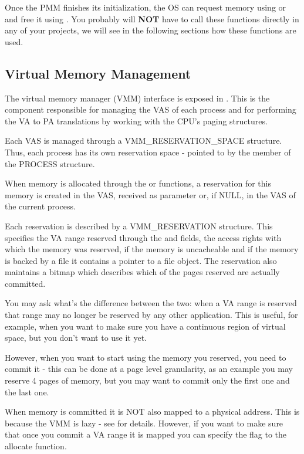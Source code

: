 \begin{appendices}
Once the PMM finishes its initialization, the OS can request memory using  or
 and free it using . You probably will \textbf{NOT}
have to call these functions directly in any of your projects, we will see in the following sections
how these functions are used.

\subsection{Virtual Memory Management}
\label{sect:VMM}

The virtual memory manager (VMM) interface is exposed in . This is the component
responsible for managing the VAS of each process and for performing the VA to PA translations by
working with the CPU's paging structures.

Each VAS is managed through a VMM\_RESERVATION\_SPACE structure. Thus, each process has its own
reservation space - pointed to by the  member of the PROCESS structure.

When memory is allocated through the  or  functions, a
reservation for this memory is created in the VAS, received as parameter or, if NULL, in the VAS of
the current process.

Each reservation is described by a VMM\_RESERVATION structure. This specifies the VA range reserved
through the  and  fields, the access rights with which the memory was
reserved, if the memory is uncacheable and if the memory is backed by a file it contains a pointer
to a file object. The reservation also maintains a bitmap which describes which of the pages reserved
are actually committed.

You may ask what's the difference between the two: when a VA range is reserved that range may no
longer be reserved by any other application. This is useful, for example, when you want to make sure
you have a continuous region of virtual space, but you don't want to use it yet.

However, when you want to start using the memory you reserved, you need to commit it - this can be
done at a page level granularity, as an example you may reserve 4 pages of memory, but you may want 
to commit only the first one and the last one.

When memory is committed it is NOT also mapped to a physical address. This is because the VMM is
lazy - see  for details. However, if you want to make sure that once you 
commit a VA range it is mapped you can specify the  flag
to the allocate function.


\end{appendices}
